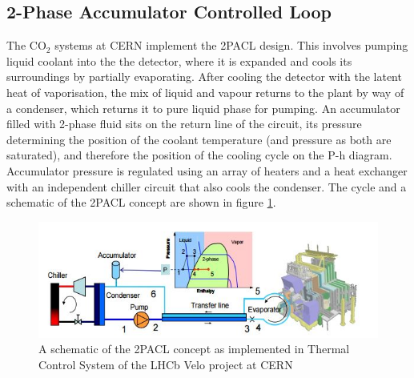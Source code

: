 \documentclass{report}
\begin{document}
\subsection{2-Phase Accumulator Controlled Loop}
The CO$_2$ systems at CERN implement the 2PACL design. This involves pumping liquid coolant into the the detector, where it is expanded and cools its surroundings by partially evaporating. After cooling the detector with the latent heat of vaporisation, the mix of liquid and vapour returns to the plant by way of a condenser, which returns it to pure liquid phase for pumping. An accumulator filled with 2-phase fluid sits on the return line of the circuit, its pressure determining the position of the coolant temperature (and pressure as both are saturated), and therefore the position of the cooling cycle on the P-h diagram. Accumulator pressure is regulated using an array of heaters and a heat exchanger with an independent chiller circuit that also cools the condenser. The cycle and a schematic of the 2PACL concept are shown in figure \ref{fig:2PACL}.
\begin{figure}[h!]
\includegraphics{2PACLschem}
\caption{A schematic of the 2PACL concept as implemented in Thermal Control System of the LHCb Velo project at CERN \cite{CO2 PoS}}
\label{fig:2PACL}
\end{figure}
\end{document}
